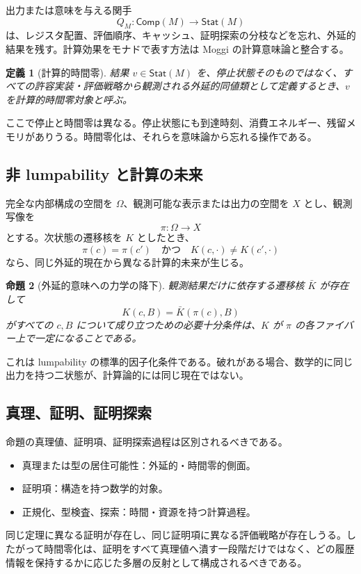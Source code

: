 \documentclass[a4paper,11pt]{ltjsarticle}
\newtheorem{definition}{定義}[section]
\newtheorem{proposition}[definition]{命題}
\theoremstyle{remark}
\newcommand{\Stat}{\mathsf{Stat}}
\newcommand{\Comp}{\mathsf{Comp}}
\begin{document}
出力または意味を与える関手
\begin{equation}
 Q_M:\Comp(M)\longrightarrow\Stat(M)
 \label{eq:computation-semantics}
\end{equation}
は、レジスタ配置、評価順序、キャッシュ、証明探索の分枝などを忘れ、外延的結果を残す。計算効果をモナドで表す方法は Moggi の計算意味論と整合する\cite{Moggi1991}。

\begin{definition}[計算的時間零]
結果 $v\in\Stat(M)$ を、停止状態そのものではなく、すべての許容実装・評価戦略から観測される外延的同値類として定義するとき、$v$ を計算的時間零対象と呼ぶ。
\end{definition}

ここで停止と時間零は異なる。停止状態にも到達時刻、消費エネルギー、残留メモリがありうる。時間零化は、それらを意味論から忘れる操作である。

\subsection{非 lumpability と計算の未来}
完全な内部構成の空間を $\Omega$、観測可能な表示または出力の空間を $X$ とし、観測写像を
\begin{equation}
 \pi:\Omega\to X
\end{equation}
とする。次状態の遷移核を $K$ としたとき、
\begin{equation}
 \pi(c)=\pi(c')
 \quad\text{かつ}\quad
 K(c,\cdot)\neq K(c',\cdot)
 \label{eq:computational-nonlump}
\end{equation}
なら、同じ外延的現在から異なる計算的未来が生じる。

\begin{proposition}[外延的意味への力学の降下]
観測結果だけに依存する遷移核 $\bar K$ が存在して
\begin{equation}
 K(c,B)=\bar K(\pi(c),B)
\end{equation}
がすべての $c,B$ について成り立つための必要十分条件は、$K$ が $\pi$ の各ファイバー上で一定になることである。
\end{proposition}

これは lumpability の標準的因子化条件である。破れがある場合、数学的に同じ出力を持つ二状態が、計算論的には同じ現在ではない。

\subsection{真理、証明、証明探索}
命題の真理値、証明項、証明探索過程は区別されるべきである。
\begin{itemize}
  \item 真理または型の居住可能性：外延的・時間零的側面。
  \item 証明項：構造を持つ数学的対象。
  \item 正規化、型検査、探索：時間・資源を持つ計算過程。
\end{itemize}
同じ定理に異なる証明が存在し、同じ証明項に異なる評価戦略が存在しうる。したがって時間零化は、証明をすべて真理値へ潰す一段階だけではなく、どの履歴情報を保持するかに応じた多層の反射として構成されるべきである。
\end{document}
